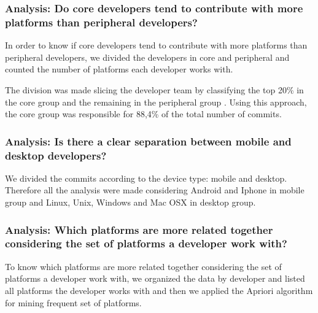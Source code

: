 \documentclass[10pt, conference]{IEEEtran}
\begin{document}
\subsubsection{Analysis: Do core developers tend to contribute with more platforms than peripheral developers?}
\label{met_analysis1}

In order to know if core developers tend to contribute with more platforms than peripheral developers, we divided the developers in core and peripheral and counted the number of platforms each developer works with. 

The division was made slicing the developer team by classifying the top 20\% in the core group and the remaining in the peripheral group \cite{Robles2009}. Using this approach, the core group was responsible for 88,4\% of the total number of commits.

 




\subsubsection{Analysis: Is there a clear separation between mobile and desktop developers?}
\label{met_analysis2}



We divided the commits according to the device type: mobile and desktop. Therefore all the analysis were made considering Android and Iphone in mobile group and Linux, Unix, Windows and Mac OSX in desktop group. 



\subsubsection{Analysis: Which platforms are more related together considering the set of platforms a developer work with? }
\label{met_analysis3}

To know which platforms are more related together considering the set of platforms a developer work with, we organized the data by developer and listed all platforms the developer works with and then we applied the Apriori algorithm for mining frequent set of platforms.
\end{document}
